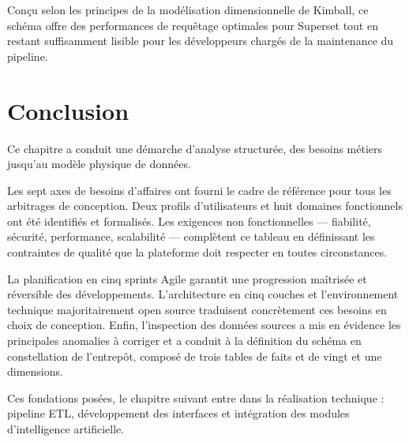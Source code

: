 Conçu selon les principes de la modélisation dimensionnelle de
Kimball, ce schéma offre des performances de requêtage optimales
pour Superset tout en restant suffisamment lisible pour les
développeurs chargés de la maintenance du pipeline.

\newpage

\section*{Conclusion}

Ce chapitre a conduit une démarche d'analyse structurée, des besoins
métiers jusqu'au modèle physique de données.

Les sept axes de besoins d'affaires ont fourni le cadre de référence
pour tous les arbitrages de conception. Deux profils d'utilisateurs
et huit domaines fonctionnels ont été identifiés et formalisés. Les
exigences non fonctionnelles — fiabilité, sécurité, performance,
scalabilité — complètent ce tableau en définissant les contraintes
de qualité que la plateforme doit respecter en toutes circonstances.

La planification en cinq sprints Agile garantit une progression
maîtrisée et réversible des développements. L'architecture en cinq
couches et l'environnement technique majoritairement open source
traduisent concrètement ces besoins en choix de conception.
Enfin, l'inspection des données sources a mis en évidence les
principales anomalies à corriger et a conduit à la définition du
schéma en constellation de l'entrepôt, composé de trois tables de
faits et de vingt et une dimensions.

Ces fondations posées, le chapitre suivant entre dans la réalisation
technique : pipeline ETL, développement des interfaces et intégration
des modules d'intelligence artificielle.